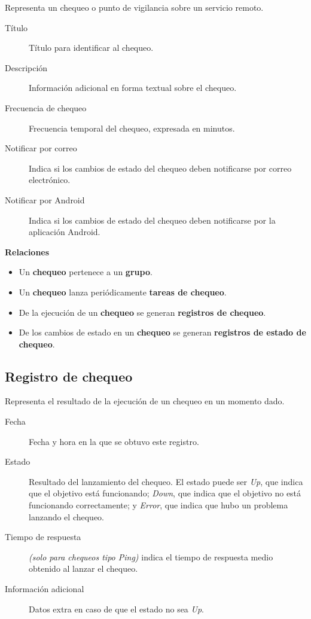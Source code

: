 Representa un chequeo o punto de vigilancia sobre un servicio remoto.

\begin{description}
\item[Título] Título para identificar al chequeo.
\item[Descripción] Información adicional en forma textual sobre el chequeo.
\item[Frecuencia de chequeo] Frecuencia temporal del chequeo, expresada en minutos.
\item[Notificar por correo] Indica si los cambios de estado del chequeo deben notificarse por correo electrónico.
\item[Notificar por Android] Indica si los cambios de estado del chequeo deben notificarse por la aplicación Android.
\end{description}

\textbf{Relaciones}

\begin{itemize}
\item Un \textbf{chequeo} pertenece a un \textbf{grupo}.
\item Un \textbf{chequeo} lanza periódicamente \textbf{tareas de chequeo}.
\item De la ejecución de un \textbf{chequeo} se generan \textbf{registros de chequeo}.
\item De los cambios de estado en un \textbf{chequeo} se generan \textbf{registros de estado de chequeo}.
\end{itemize}

\subsection{Registro de chequeo}

Representa el resultado de la ejecución de un chequeo en un momento dado.

\begin{description}
\item[Fecha] Fecha y hora en la que se obtuvo este registro.
\item[Estado] Resultado del lanzamiento del chequeo. El estado puede ser
  \textit{Up}, que indica que el objetivo está funcionando; \textit{Down}, que
  indica que el objetivo no está funcionando correctamente; y \textit{Error},
  que indica que hubo un problema lanzando el chequeo.
\item[Tiempo de respuesta] \textit{(solo para chequeos tipo Ping)} indica el
  tiempo de respuesta medio obtenido al lanzar el chequeo.
\item[Información adicional] Datos extra en caso de que el estado no sea \textit{Up}.
\end{description}

